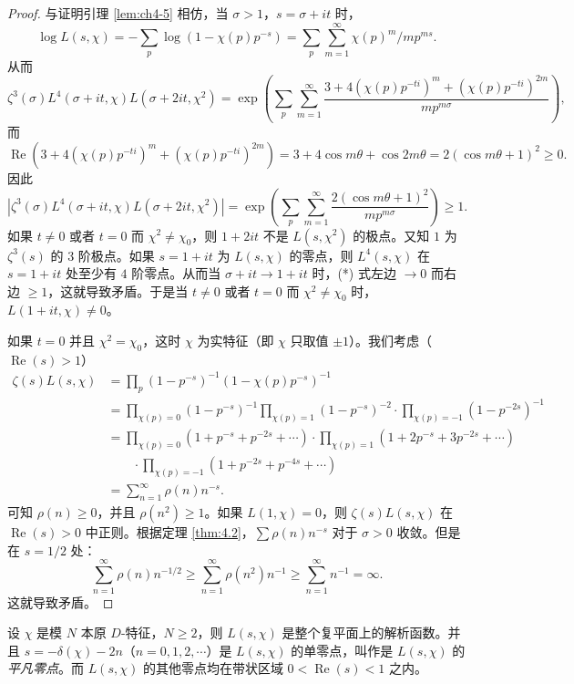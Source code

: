 \begin{proof}
与证明引理 \ref{lem:ch4-5} 相仿，当 $\sigma>1$，$s=\sigma+it$ 时，
\[
  \log L(s,\chi)=-\sum_p\log(1-\chi(p)p^{-s})
  =\sum_p\sum_{m=1}^{\infty}\chi(p)^m/mp^{ms}.
\]
从而
\[
  \zeta^3(\sigma)L^4(\sigma+it,\chi)L(\sigma+2it,\chi^2)
  =\exp\left(\sum_p\sum_{m=1}^{\infty}\frac{3+4(\chi(p)p^{-ti})^m+(\chi(p)p^{-ti})^{2m}}{mp^{m\sigma}}\right),
\]
而
\[
  \operatorname{Re}(3+4(\chi(p)p^{-ti})^m+(\chi(p)p^{-ti})^{2m})
  =3+4\cos m\theta+\cos 2m\theta
  =2(\cos m\theta+1)^2\geqslant 0.
\]
因此
\begin{equation}  |\zeta^3(\sigma)L^4(\sigma+it,\chi)L(\sigma+2it,\chi^2)|
  =\exp\left(\sum_p\sum_{m=1}^{\infty}\frac{2(\cos m\theta+1)^2}{mp^{m\sigma}}\right)\geqslant 1.\tag{*}\end{equation}
如果 $t\neq 0$ 或者 $t=0$ 而 $\chi^2\neq\chi_0$，则 $1+2it$ 不是 $L(s,\chi^2)$ 的极点。又知 $1$ 为 $\zeta^3(s)$ 的 $3$ 阶极点。如果 $s=1+it$ 为 $L(s,\chi)$ 的零点，则 $L^4(s,\chi)$ 在 $s=1+it$ 处至少有 $4$ 阶零点。从而当 $\sigma+it\to 1+it$ 时，(*) 式左边 $\to 0$ 而右边 $\geqslant 1$，这就导致矛盾。于是当 $t\neq 0$ 或者 $t=0$ 而 $\chi^2\neq\chi_0$ 时，$L(1+it,\chi)\neq 0$。

如果 $t=0$ 并且 $\chi^2=\chi_0$，这时 $\chi$ 为实特征（即 $\chi$ 只取值 $\pm1$）。我们考虑（$\operatorname{Re}(s)>1$）
\begin{align*}
  \zeta(s)L(s,\chi)&=\prod_p(1-p^{-s})^{-1}(1-\chi(p)p^{-s})^{-1}\\
  &=\prod_{\chi(p)=0}(1-p^{-s})^{-1}\prod_{\chi(p)=1}(1-p^{-s})^{-2}\cdot\prod_{\chi(p)=-1}(1-p^{-2s})^{-1}\\
  &=\prod_{\chi(p)=0}(1+p^{-s}+p^{-2s}+\cdots)\cdot\prod_{\chi(p)=1}(1+2p^{-s}+3p^{-2s}+\cdots)\\
  &\qquad\cdot\prod_{\chi(p)=-1}(1+p^{-2s}+p^{-4s}+\cdots)\\
  &=\sum_{n=1}^{\infty}\rho(n)n^{-s}.
\end{align*}
可知 $\rho(n)\geqslant 0$，并且 $\rho(n^2)\geqslant 1$。如果 $L(1,\chi)=0$，则 $\zeta(s)L(s,\chi)$ 在 $\operatorname{Re}(s)>0$ 中正则。根据定理 \ref{thm:4.2}，$\sum\rho(n)n^{-s}$ 对于 $\sigma>0$ 收敛。但是在 $s=1/2$ 处：
\[
  \sum_{n=1}^{\infty}\rho(n)n^{-1/2}\geqslant\sum_{n=1}^{\infty}\rho(n^2)n^{-1}\geqslant\sum_{n=1}^{\infty}n^{-1}=\infty.
\]
这就导致矛盾。
\end{proof}

\begin{lemma}\label{lem:ch4-9}
设 $\chi$ 是模 $N$ 本原 $D$-特征，$N\geqslant 2$，则 $L(s,\chi)$ 是整个复平面上的解析函数。并且 $s=-\delta(\chi)-2n$（$n=0,1,2,\cdots$）是 $L(s,\chi)$ 的单零点，叫作是 $L(s,\chi)$ 的\emph{平凡零点}。而 $L(s,\chi)$ 的其他零点均在带状区域 $0<\operatorname{Re}(s)<1$ 之内。
\end{lemma}


